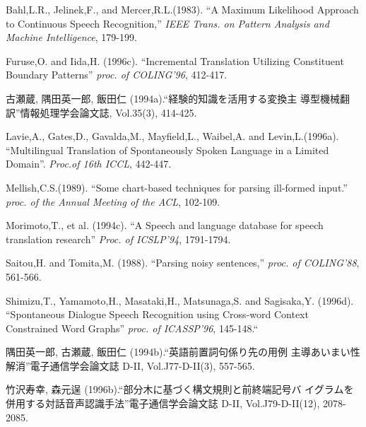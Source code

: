 \begin{thebibliography}{}

 \bibitem[]{} Bahl,L.R., Jelinek,F., and Mercer,R.L.(1983). ``A Maximum
 Likelihood Approach to Continuous Speech Recognition,'' {\it IEEE
 Trans. on Pattern Analysis and Machine Intelligence}, 179-199.

 \bibitem[]{} Furuse,O. and Iida,H. (1996c). ``Incremental Translation
 Utilizing Constituent Boundary Patterns'' {\it proc. of COLING'96},
 412-417.

 \bibitem[]{} 古瀬蔵, 隅田英一郎, 飯田仁 (1994a).``経験的知識を活用する変換主
 導型機械翻訳''情報処理学会論文誌, Vol.35(3), 414-425.

 \bibitem[]{} Lavie,A., Gates,D., Gavalda,M., Mayfield,L., Waibel,A. and
 Levin,L.(1996a).  ``Multilingual Translation of Spontaneously Spoken
 Language in a Limited Domain''.  {\it Proc.of 16th ICCL}, 442-447.

 \bibitem[]{} Mellish,C.S.(1989). ``Some chart-based techniques for parsing
 ill-formed input.''  {\it proc. of the Annual Meeting of the ACL},
 102-109.

 \bibitem[]{} Morimoto,T., et al. (1994c). ``A Speech and language
 database for speech translation research'' {\it Proc. of ICSLP'94},
 1791-1794.

 \bibitem[]{} Saitou,H. and Tomita,M. (1988). ``Parsing noisy sentences,''
 {\it proc. of COLING'88}, 561-566.

 \bibitem[]{} Shimizu,T., Yamamoto,H., Masataki,H., Matsunaga,S. and
 Sagisaka,Y. (1996d).  ``Spon\-taneous Dialogue Speech Recognition using
 Cross-word Context Constrained Word Graphs'' {\it proc. of ICASSP'96},
 145-148.``

 \bibitem[]{} 隅田英一郎, 古瀬蔵, 飯田仁 (1994b).``英語前置詞句係り先の用例
 主導あいまい性解消''電子通信学会論文誌 D-II, Vol.J77-D-II(3), 557-565.

 \bibitem[]{} 竹沢寿幸, 森元逞 (1996b).``部分木に基づく構文規則と前終端記号バ
 イグラムを併用する対話音声認識手法''電子通信学会論文誌 D-II,
 Vol.J79-D-II(12), 2078-2085.

\end{thebibliography}

